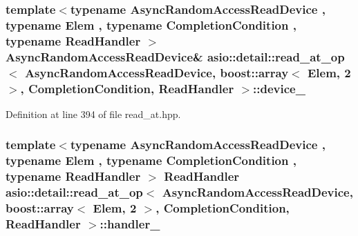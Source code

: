 \subsubsection[{device\+\_\+}]{\setlength{\rightskip}{0pt plus 5cm}template$<$typename Async\+Random\+Access\+Read\+Device , typename Elem , typename Completion\+Condition , typename Read\+Handler $>$ Async\+Random\+Access\+Read\+Device\& {\bf asio\+::detail\+::read\+\_\+at\+\_\+op}$<$ Async\+Random\+Access\+Read\+Device, {\bf boost\+::array}$<$ Elem, 2 $>$,                           Completion\+Condition, Read\+Handler $>$\+::device\+\_\+}\label{classasio_1_1detail_1_1read__at__op_3_01_async_random_access_read_device_00_01boost_1_1array_3_00756f1b0c223a71b75bb1b3f8c0f0e31_a204ee03f7357d0da4c73da47a7ac508b}


Definition at line 394 of file read\+\_\+at.\+hpp.

\hypertarget{classasio_1_1detail_1_1read__at__op_3_01_async_random_access_read_device_00_01boost_1_1array_3_00756f1b0c223a71b75bb1b3f8c0f0e31_a7bc5d59f8dad58e488e626517eafcb68}{}
\subsubsection[{handler\+\_\+}]{\setlength{\rightskip}{0pt plus 5cm}template$<$typename Async\+Random\+Access\+Read\+Device , typename Elem , typename Completion\+Condition , typename Read\+Handler $>$ Read\+Handler {\bf asio\+::detail\+::read\+\_\+at\+\_\+op}$<$ Async\+Random\+Access\+Read\+Device, {\bf boost\+::array}$<$ Elem, 2 $>$,                           Completion\+Condition, Read\+Handler $>$\+::handler\+\_\+}\label{classasio_1_1detail_1_1read__at__op_3_01_async_random_access_read_device_00_01boost_1_1array_3_00756f1b0c223a71b75bb1b3f8c0f0e31_a7bc5d59f8dad58e488e626517eafcb68}


